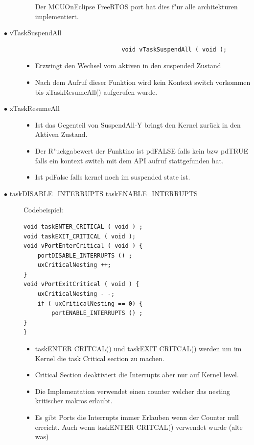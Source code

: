 \documentclass[a4paper, 8pt]{extarticle}
\begin{document}
\begin{multicols*}{3}
\begin{description}
\begin{itemize}
								  Der MCUOnEclipse FreeRTOS port hat dies f"ur alle architekturen implementiert.
						\end{itemize} 	
					\item[$\bullet$ vTaskSuspendAll]
						\begin{lstlisting}
							void vTaskSuspendAll ( void );
						\end{lstlisting}  
						\begin{itemize}
							\item Erzwingt den Wechsel vom aktiven in den suspended Zustand
							\item Nach dem Aufruf dieser Funktion wird kein Kontext switch vorkommen bis xTaskResumeAll() aufgerufen wurde.					
						\end{itemize} 
					\item[$\bullet$ xTaskResumeAll]
						\begin{itemize}
							\item Ist das Gegenteil von SuspendAll-Y bringt den Kernel zurück in den Aktiven Zustand.
							\item Der R"uckgabewert der Funktino ist pdFALSE falls kein bzw pdTRUE falls ein kontext switch mit dem API aufruf stattgefunden hat.
							\item Ist pdFalse falls kernel noch im suspended state ist.					
						\end{itemize} 
					\item[$\bullet$ taskDISABLE\_INTERRUPTS taskENABLE\_INTERRUPTS]
					Codebeispiel:
						\begin{lstlisting}
void taskENTER_CRITICAL ( void ) ;
void taskEXIT_CRITICAL ( void );
void vPortEnterCritical ( void ) {
	portDISABLE_INTERRUPTS () ;
	uxCriticalNesting ++;
}
void vPortExitCritical ( void ) {
	uxCriticalNesting - -;
	if ( uxCriticalNesting == 0) {
		portENABLE_INTERRUPTS () ;
}
}
						\end{lstlisting} 						
						\begin{itemize}
							\item taskENTER CRITCAL() und taskEXIT CRITCAL() werden um im Kernel die task Critical section zu machen. 
							\item Critical Section deaktiviert die Interrupts aber nur auf Kernel level.
							\item Die Implementation verwendet einen counter welcher das nesting kritischer makros erlaubt.
							\item Es gibt Ports die Interrupts immer Erlauben wenn der Counter null erreicht. Auch wenn 
								  taskENTER CRITCAL() verwendet wurde (alte was)

\end{itemize}
\end{description}
\end{multicols*}
\end{document}
